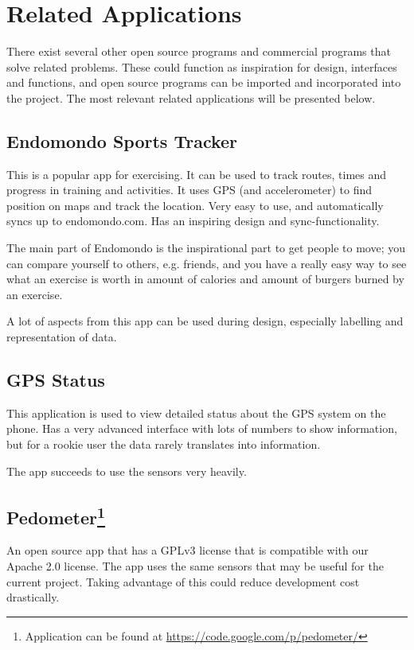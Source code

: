 \section{Related Applications}
There exist several other open source programs and commercial programs that solve related problems. These could function as inspiration for design, interfaces and functions, and open source programs can be imported and incorporated into the project. The most relevant related applications will be presented below.

\subsection{Endomondo Sports Tracker}
This is a popular app for exercising. It can be used to track routes, times and progress in training and activities. It uses GPS (and accelerometer) to find position on maps and track the location. Very easy to use, and automatically syncs up to endomondo.com. Has an inspiring design and sync-functionality.

The main part of Endomondo is the inspirational part to get people to move; you can compare yourself to others, e.g. friends, and you have a really easy way to see what an exercise is worth in amount of calories and amount of burgers burned by an exercise.

A lot of aspects from this app can be used during design, especially labelling and representation of data.

\subsection{GPS Status}
This application is used to view detailed status about the GPS system on the phone. Has a very advanced interface with lots of numbers to show information, but for a rookie user the data rarely translates into information.

The app succeeds to use the sensors very heavily.

\subsection{Pedometer\footnote{Application can be found at \url{https://code.google.com/p/pedometer/}}}
An open source app that has a GPLv3 license that is compatible with our Apache 2.0 license. The app uses the same sensors that may be useful for the current project. Taking advantage of this could reduce development cost drastically.


